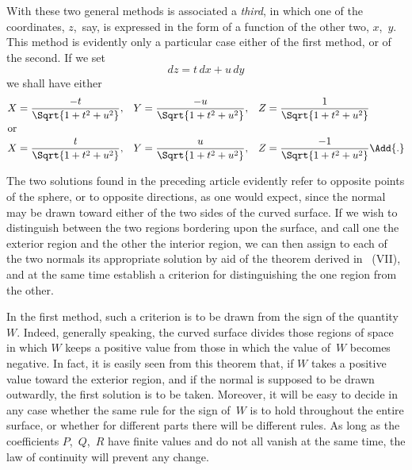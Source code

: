 With these two general methods is associated a \emph{third}, in which one of the coordinates,
$z$,~say, is expressed in the form of a function of the other two, $x$,~$y$. This method is
evidently only a particular case either of the first method, or of the second. If we set
\[
dz = t\, dx + u\, dy
\]
we shall have either
\begin{align*}
X &= \frac{-t}{\Sqrt{1 + t^{2} + u^{2}}}, &
Y &= \frac{-u}{\Sqrt{1 + t^{2} + u^{2}}}, &
Z &= \frac{ 1}{\Sqrt{1 + t^{2} + u^{2}}} \\
\intertext{or}
X &= \frac{ t}{\Sqrt{1 + t^{2} + u^{2}}}, &
Y &= \frac{ u}{\Sqrt{1 + t^{2} + u^{2}}}, &
Z &= \frac{-1}{\Sqrt{1 + t^{2} + u^{2}}}\Add{.}
\end{align*}



The two solutions found in the preceding article evidently refer to opposite points of
the sphere, or to opposite directions, as one would expect, since the normal may be drawn
toward either of the two sides of the curved surface. If we wish to distinguish between
the two regions bordering upon the surface, and call one the exterior region and the other
the interior region, we can then assign to each of the two normals its appropriate solution
by aid of the theorem derived in ~(VII), and at the same time establish a criterion
for distinguishing the one region from the other.

In the first method, such a criterion is to be drawn from the sign of the quantity~$W$.
Indeed, generally speaking, the curved surface divides those regions of space in which $W$
keeps a positive value from those in which the value of~$W$ becomes negative. In fact, it
is easily seen from this theorem that, if $W$ takes a positive value toward the exterior
region, and if the normal is supposed to be drawn outwardly, the first solution is to be
taken. Moreover, it will be easy to decide in any case whether the same rule for the
sign of~$W$ is to hold throughout the entire surface, or whether for different parts there
will be different rules. As long as the coefficients $P$,~$Q$,~$R$ have finite values and do not
all vanish at the same time, the law of continuity will prevent any change.

